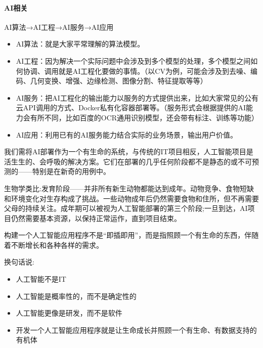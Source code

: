 \documentclass[letterpaper,11pt,english]{sphinxmanual}
\begin{document}
\paragraph{AI相关}
\label{\detokenize{chapter_knowledge/project_manage:ai}}
AI算法→AI工程→AI服务→AI应用
%
\begin{footnote}[568]\sphinxAtStartFootnote
{}
%
\end{footnote}
\begin{itemize}
\item {} 
AI算法：就是大家平常理解的算法模型。

\item {} 
AI工程：因为解决一个实际问题中会涉及到多个模型的处理，多个模型之间如何协调、调用就是AI工程化要做的事情。（以CV为例，可能会涉及到去噪、编码、几何变换、增强、边缘检测、图像分割、特征提取等等）

\item {} 
AI服务：把AI工程化的输出能力以服务的方式提供出来，比如大家常见的公有云API调用的方式、Docker私有化容器部署等。（服务形式会根据提供的AI能力会有所不同，比如百度的OCR通用识别模型，还会带有标注、训练等功能）

\item {} 
AI应用：利用已有的AI服务能力结合实际的业务场景，输出用户价值。

\end{itemize}

我们需将AI部署作为一个有生命的系统，与传统的IT项目相反，人工智能项目是活生生的、会呼吸的解决方案。它们在部署的几乎任何阶段都不是静态的或不可预测的——特别是在新奇的用例中。%
\begin{footnote}[569]\sphinxAtStartFootnote
{}
%
\end{footnote}

生物学类比:发育阶段——并非所有新生动物都能达到成年。动物竞争、食物短缺和环境变化对生存构成了挑战。一些动物成年后仍然需要食物和住所，但不再需要父母的持续关注。成年期可以被视为人工智能部署的第三个阶段;一旦到达，AI项目仍然需要基本资源，以保持正常运作，直到项目结束。

构建一个人工智能应用程序不是“即插即用”，而是指照顾一个有生命的东西，伴随着不断增长和各种各样的需求。

换句话说:
\begin{itemize}
\item {} 
人工智能不是IT

\item {} 
人工智能是概率性的，而不是确定性的

\item {} 
人工智能更像是研发，而不是软件

\item {} 
开发一个人工智能应用程序就是让生命成长并照顾一个有生命、有数据支持的有机体

\end{itemize}
\end{document}
